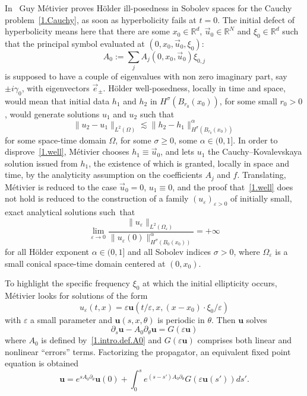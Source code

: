\documentclass[AHL,Unicode,longabstracts,published]{cedram}
\theoremstyle{plain}
\newcommand*\e{\varepsilon}
\newcommand*\R{{\mathbb R}}
\newcommand{\dptl}{\partial}%
\newcommand{\alf}{\alpha}%
\newcommand*\g{\gamma}
\newcommand{\ubf}{{\mathbf u}}
\begin{document}
In~\cite[Section~3]{metivier2005remarks} Guy Métivier proves H\"older ill-posedness in Sobolev spaces for the Cauchy problem~\eqref{1.Cauchy}, as soon as hyperbolicity fails at $t=0$. The initial defect of hyperbolicity means here that there are some $x_0\in\R^d$, $\vec{u}_0\in\R^N$ and $\xi_0\in\R^{d}$ such that the principal symbol evaluated at $(0,x_0,\vec{u}_0,\xi_0)$:
\begin{equation}\label{1.intro.def.A0}
A_0 := \sum_j A_j(0,x_0,\vec{u}_0)\xi_{0,j}
\end{equation}
is supposed to have a couple of eigenvalues with non zero imaginary part, say $\pm i \g_0$, with eigenvectors $\vec{e}_{\pm}$. H\"older well-posedness, locally in time and space, would mean that initial data $h_1$ and $h_2$ in $H^{\sigma}(B_{r_0}(x_0))$, for some small $r_0>0$, would generate solutions $u_1$ and $u_2$ such that
\begin{equation}\label{1.well}
\|u_2 - u_1\|_{L^2(\Omega)} \lesssim \| h_2 - h_1 \|_{H^{\sigma}\left(B_{r_0}(x_0)\right)}^{\alf}
\end{equation}
for some space-time domain $\Omega$, for some $\sigma\geq 0$, some $\alf\in(0,1]$. In order to disprove~\eqref{1.well}, Métivier chooses $h_1 \equiv \vec{u}_0$, and lets $u_1$ the Cauchy--Kovalevskaya solution issued from $h_1$, the existence of which is granted, locally in space and time, by the analyticity assumption on the coefficients $A_j$ and $f$. Translating, Métivier is reduced to the case $\vec{u}_0=0$, $u_1 \equiv 0$, and the proof that~\eqref{1.well} does not hold is reduced to the construction of a family $(u_{\e})_{\e >0}$ of initially small, exact analytical solutions such~that
\begin{equation}\label{1.intro.holder}
\lim_{\e\to0} \frac{\|u_{\e}\|_{L^2(\Omega_{\e})}}{\|u_{\e}(0)\|^{\alf}_{H^{\sigma}(B_0(x_0))}} = +\infty
\end{equation}
for all H\"older exponent $\alf \in (0,1]$ and all Sobolev indices $\sigma >0$, where $\Omega_{\e}$ is a small conical space-time domain centered at $(0,x_0)$.

To highlight the specific frequency $\xi_0$ at which the initial ellipticity occurs, Métivier looks for solutions of the form
\begin{equation}\label{1.intro.ansatz}
u_{\e}(t,x) = \e \ubf(t/\e, x, (x-x_0)\cdot\xi_0/\e)
\end{equation}
with $\e$ a small parameter and $\ubf(s,x,\theta)$ is periodic in $\theta$. Then $\ubf$ solves
\begin{equation}\label{1.intro.equation}
\dptl_{s}\ubf - A_0\dptl_{\theta}\ubf = G(\e \ubf)
\end{equation}
where $A_0$ is defined by~\eqref{1.intro.def.A0} and $G(\e \ubf)$ comprises both linear and nonlinear ``errors'' terms. Factorizing the propagator, an equivalent fixed point equation is obtained
\begin{equation}\label{1.intro.pointfixe}
\ubf = e^{sA_0\dptl_{\theta}}\ubf(0) + \int_{0}^{s} e^{(s-s')A_0\dptl_{\theta}}G(\e \ubf(s'))ds'.
\end{equation}
\end{document}
